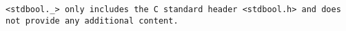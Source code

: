 \tt{<stdbool._>} only includes the C standard header
\tt{<stdbool.h>} and does not provide any additional content.
